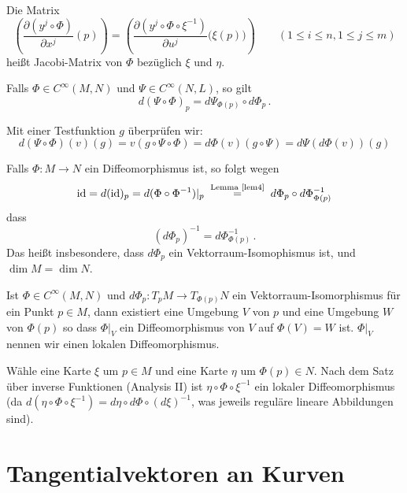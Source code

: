 \documentclass[a4paper,twoside,DIV15,BCOR12mm]{scrbook}
\begin{document}
\begin{definition}
Die Matrix 
\[
\left( \frac{\partial (y^j\circ \Phi)}{\partial x^j}(p)\right) 
= \left( \frac{\partial(y^j\circ \Phi \circ \xi^{-1})}{\partial u^j}\big(\xi(p)\big)\right)
\qquad (1\le i\le n, 1\le j\le m)
\]
heißt Jacobi-Matrix von $\Phi$ bezüglich $\xi$ und $\eta$.
\end{definition}

\begin{lemma}[Kettenregel]
\label{lem4}
Falls $\Phi\in C^\infty(M,N)$ und $\Psi \in C^\infty(N,L)$, so gilt
\[
d(\Psi\circ\Phi)_p = d\Psi_{\Phi(p)} \circ d\Phi_p\,.
\]
\end{lemma}

\begin{beweis}
Mit einer Testfunktion $g$ überprüfen wir:
\[
d(\Psi \circ \Phi)(v)(g) = v(g \circ \Psi \circ \Phi) = d\Phi(v)(g \circ \Psi) = d\Psi(d\Phi(v))(g)
\]
\end{beweis}

\begin{bemerkung}
Falls $\Phi: M\to N$ ein Diffeomorphismus ist, so folgt wegen
\[ \text{id} = d(\text{id})_p = d(\Phi \circ \Phi^{-1})|_p \gleichnach{Lemma \ref{lem4}} d\Phi_p \circ d\Phi^{-1}_{\Phi(p)} \]
dass
\[ (d\Phi_p)^{-1} = d\Phi_{\Phi(p)}^{-1}\,. \]
Das heißt insbesondere, dass $d\Phi_p$ ein Vektorraum-Isomophismus ist, und $\dim M = \dim N$.
\end{bemerkung}

\begin{satz}
\label{invfunk}
Ist $\Phi \in C^\infty(M,N)$ und $d\Phi_p:T_pM \to T_{\Phi(p)}N$ ein Vektorraum-Isomorphismus für ein Punkt $p\in M$, dann existiert eine Umgebung $V$ von $p$ und eine Umgebung $W$ von $\Phi(p)$ so dass $\Phi|_V$ ein Diffeomorphismus von $V$ auf $\Phi(V)=W$ ist. $\Phi|_V$ nennen wir einen lokalen Diffeomorphismus.
\end{satz}

\begin{beweis}
Wähle eine Karte $\xi$ um $p\in M$ und eine Karte $\eta$ um $\Phi(p)\in N$. Nach dem Satz über inverse Funktionen (Analysis II) ist $\eta \circ \Phi \circ \xi^{-1}$ ein lokaler Diffeomorphismus (da $d(\eta \circ \Phi \circ \xi^{-1}) = d\eta \circ d\Phi \circ (d\xi)^{-1}$, was jeweils reguläre lineare Abbildungen sind).
\end{beweis}

\section{Tangentialvektoren an Kurven}
\end{document}
